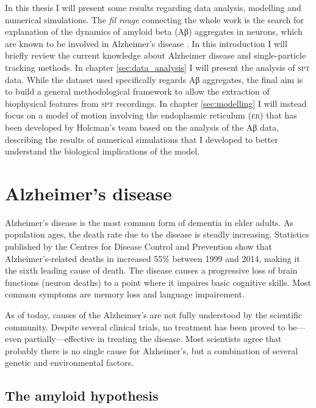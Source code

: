 In this thesis I will present some results regarding data analysis, modelling and numerical simulations. The \textit{fil rouge} connecting the whole work is the search for explanation of the dynamics of amyloid beta (Aβ) aggregates in neurons, which are known to be involved in Alzheimer's disease \cite{AD}. In this introduction I will briefly review the current knowledge about Alzheimer disease and single-particle tracking methods. In chapter \ref{sec:data_analysis} I will present the analysis of \textsc{spt} data. While the dataset used specifically regards Aβ aggregates, the final aim is to build a general methodological framework to allow the extraction of biophysical features from \textsc{spt} recordings. In chapter \ref{sec:modelling} I will instead focus on a model of motion involving the endoplasmic reticulum (\textsc{er}) that has been developed by Holcman's team \cite{parutto_er} based on the analysis of the Aβ data, describing the results of numerical simulations that I developed to better understand the biological implications of the model.

\section{Alzheimer's disease}

Alzheimer’s disease is the most common form of dementia in elder adults. As population ages, the death rate due to the disease is steadly increasing. Statistics published by the Centres for Disease Control and Prevention show that Alzheimer’s-related deaths in  increased 55\% between 1999 and 2014, making it the sixth leading cause of death. The disease causes a progressive loss of brain functions (neuron deaths) to a point where it impaires basic cognitive skills. Most common symptoms are memory loss and language impairement.

As of today, causes of the Alzheimer’s are not fully understood by the scientific community. Despite several clinical trials, no treatment has been proved to be---even partially---effective in treating the disease. Most scientists agree that probably there is no single cause for Alzheimer’s, but a combination of several genetic and environmental factors.


\subsection{The amyloid hypothesis}

